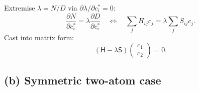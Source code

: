 \documentclass[11pt]{article}
\newcommand{\pdone}[2]{\frac{\partial #1}{\partial #2}}
\begin{document}
Extremise $\lambda=N/D$ via $\partial\lambda/\partial c_i^{*}=0$:
\begin{equation}
\pdone{N}{c_i^{*}}=\lambda\pdone{D}{c_i^{*}}\quad\Longleftrightarrow\quad\sum_j H_{ij}c_j=\lambda\sum_j S_{ij}c_j.
\end{equation}
Cast into matrix form:
\begin{equation}
\boxed{\,(\mathsf H-\lambda\mathsf S)\begin{pmatrix}c_1\\ c_2\end{pmatrix}=0.\,}
\label{eq:secular-mat}
\end{equation}

\subsection*{(b) Symmetric two-atom case}
\end{document}
